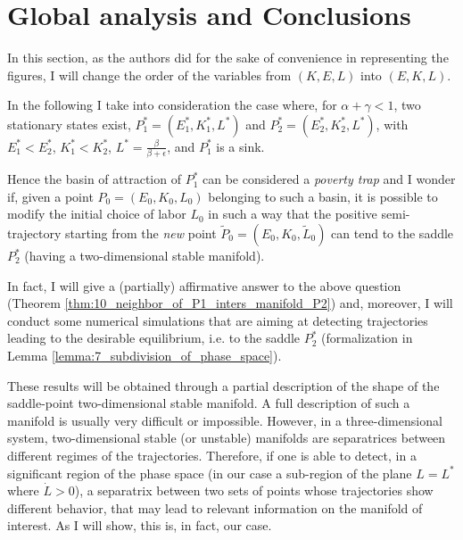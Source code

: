 \section{Global analysis and Conclusions}\label{Sec:glob_anal_conclusion}
In this section, as the authors did for the sake of convenience in representing the figures, I will change the order of the variables from $(K,E,L)$ into $(E,K,L)$.

In the following I take into consideration the case where, for $\alpha+\gamma<1$, two stationary states exist, $P_1^* = (E_1^*,K_1^*,L^*)$ and $P_2^* = (E_2^*,K_2^*,L^*)$, with $E_1^* < E_2^*$, $K_1^* < K_2^*$, $L^* = \frac{\beta}{\beta+\epsilon}$, and $P_1^*$ is a sink.

Hence the basin of attraction of $P_1^*$ can be considered a \textit{poverty trap} and I wonder if, given a point $P_0 = (E_0,K_0,L_0)$ belonging to such a basin, it is possible to modify the initial choice of labor $L_0$ in such a way that the positive semi-trajectory starting from the \textit{new} point $\widetilde{P}_0 = (E_0,K_0,\widetilde{L}_0)$ can tend to the saddle $P_2^*$ (having a two-dimensional stable manifold).

In fact, I will give a (partially) affirmative answer to the above question (Theorem \ref{thm:10_neighbor_of_P1_inters_manifold_P2}) and, moreover, I will conduct some numerical simulations that are aiming at detecting trajectories leading to the desirable equilibrium, i.e. to the saddle $P_2^*$ (formalization in Lemma \ref{lemma:7_subdivision_of_phase_space}).

These results will be obtained through a partial description of the shape of the saddle-point two-dimensional stable manifold. A full description of such a manifold is usually very difficult or impossible. However, in a three-dimensional system, two-dimensional stable (or unstable) manifolds are separatrices between different regimes of the trajectories. Therefore, if one is able to detect, in a significant region of the phase space (in our case a sub-region of the plane $L = L^*$ where $\dot{L}>0$), a separatrix between two sets of points whose trajectories show different behavior, that may lead to relevant information on the manifold of interest. As I will show, this is, in fact, our case.

